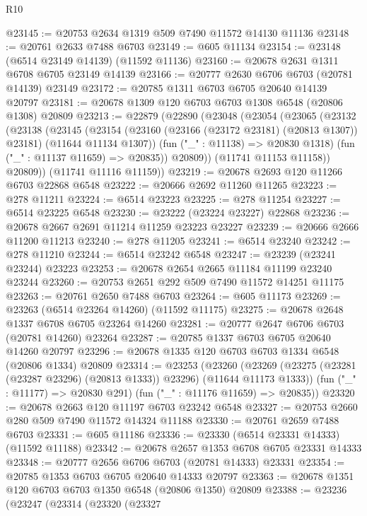 \begin{lexlean}{R10}
\begin{coremodule}
@23145 := @20753 @2634 @1319 @509 @7490 @11572 @14130 @11136
@23148 := @20761 @2633 @7488 @6703
@23149 := @605 @11134
@23154 := @23148 (@6514 @23149 @14139) (@11592 @11136)
@23160 := @20678 @2631 @1311 @6708 @6705 @23149 @14139
@23166 := @20777 @2630 @6706 @6703 (@20781 @14139) @23149
@23172 := @20785 @1311 @6703 @6705 @20640 @14139 @20797
@23181 := @20678 @1309 @120 @6703 @6703 @1308 @6548 (@20806 @1308) @20809
@23213 := @22879
    (@22890
      (@23048
        (@23054
          (@23065
            (@23132
              (@23138
                (@23145
                  (@23154
                    (@23160 (@23166 (@23172 @23181) (@20813 @1307)) @23181)
                    (@11644 @11134 @1307))
                  (fun ("_" : @11138) => @20830 @1318)
                  (fun ("_" : @11137 @11659) => @20835))
                @20809))
            (@11741 @11153 @11158))
          @20809))
      (@11741 @11116 @11159))
@23219 := @20678 @2693 @120 @11266 @6703 @22868 @6548
@23222 := @20666 @2692 @11260 @11265
@23223 := @278 @11211
@23224 := @6514 @23223
@23225 := @278 @11254
@23227 := @6514 @23225 @6548
@23230 := @23222 (@23224 @23227) @22868
@23236 := @20678 @2667 @2691 @11214 @11259 @23223 @23227
@23239 := @20666 @2666 @11200 @11213
@23240 := @278 @11205
@23241 := @6514 @23240
@23242 := @278 @11210
@23244 := @6514 @23242 @6548
@23247 := @23239 (@23241 @23244) @23223
@23253 := @20678 @2654 @2665 @11184 @11199 @23240 @23244
@23260 := @20753 @2651 @292 @509 @7490 @11572 @14251 @11175
@23263 := @20761 @2650 @7488 @6703
@23264 := @605 @11173
@23269 := @23263 (@6514 @23264 @14260) (@11592 @11175)
@23275 := @20678 @2648 @1337 @6708 @6705 @23264 @14260
@23281 := @20777 @2647 @6706 @6703 (@20781 @14260) @23264
@23287 := @20785 @1337 @6703 @6705 @20640 @14260 @20797
@23296 := @20678 @1335 @120 @6703 @6703 @1334 @6548 (@20806 @1334) @20809
@23314 := @23253
    (@23260
      (@23269 (@23275 (@23281 (@23287 @23296) (@20813 @1333)) @23296) (@11644 @11173 @1333))
      (fun ("_" : @11177) => @20830 @291)
      (fun ("_" : @11176 @11659) => @20835))
@23320 := @20678 @2663 @120 @11197 @6703 @23242 @6548
@23327 := @20753 @2660 @280 @509 @7490 @11572 @14324 @11188
@23330 := @20761 @2659 @7488 @6703
@23331 := @605 @11186
@23336 := @23330 (@6514 @23331 @14333) (@11592 @11188)
@23342 := @20678 @2657 @1353 @6708 @6705 @23331 @14333
@23348 := @20777 @2656 @6706 @6703 (@20781 @14333) @23331
@23354 := @20785 @1353 @6703 @6705 @20640 @14333 @20797
@23363 := @20678 @1351 @120 @6703 @6703 @1350 @6548 (@20806 @1350) @20809
@23388 := @23236
    (@23247
      (@23314
        (@23320
          (@23327

\end{coremodule}
\end{lexlean}
